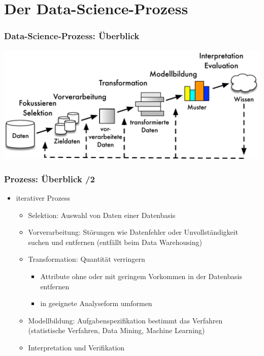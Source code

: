 
\section{Der Data-Science-Prozess}

\begin{frame}[c]
\frametitle{Data-Science-Prozess: Überblick}

\includegraphics[scale=.6]{fig1/kdd-prozess.pdf}

\end{frame}


\begin{frame}
\frametitle{Prozess: Überblick /2}

\begin{itemize}
\item iterativer Prozess
\begin{itemize}
\item Selektion: Auswahl von Daten einer Datenbasis
\item Vorverarbeitung: Störungen wie Datenfehler oder
  Unvollständigkeit suchen und entfernen (entfällt beim Data Warehousing)
\item Transformation: Quantität verringern
\begin{itemize}
\item Attribute ohne oder mit geringem Vorkommen in der Datenbasis entfernen
\item in geeignete Analyseform umformen
\end{itemize}
\item Modellbildung: Aufgabenspezifikation bestimmt das Verfahren (statistische Verfahren, Data Mining, Machine Learning)
\item Interpretation und Verifikation
\end{itemize}
\end{itemize}


\end{frame}

